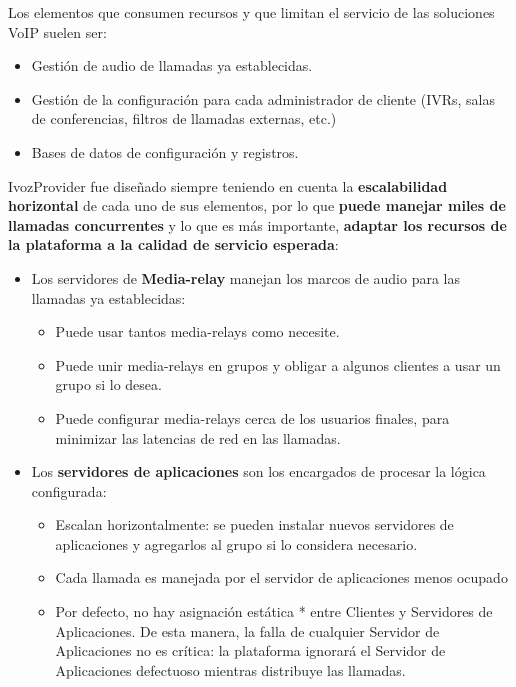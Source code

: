 \documentclass[letterpaper,10pt,spanish]{sphinxmanual}
\begin{document}
Los elementos que consumen recursos y que limitan el servicio de las soluciones VoIP suelen ser:
\begin{itemize}
\item {} 
Gestión de audio de llamadas ya establecidas.

\item {} 
Gestión de la configuración para cada administrador de cliente (IVRs, salas de conferencias, filtros de llamadas externas, etc.)

\item {} 
Bases de datos de configuración y registros.

\end{itemize}

IvozProvider fue diseñado siempre teniendo en cuenta la \textbf{escalabilidad horizontal} de cada uno de sus elementos, por lo que \textbf{puede manejar miles de llamadas concurrentes} y lo que es más importante, \textbf{adaptar los recursos de la plataforma a la calidad de servicio esperada}:
\begin{itemize}
\item {} 
Los servidores de \textbf{Media-relay} manejan los marcos de audio para las llamadas ya establecidas:
\begin{itemize}
\item {} 
Puede usar tantos media-relays como necesite.

\item {} 
Puede unir media-relays en grupos y obligar a algunos clientes a usar un grupo si lo desea.

\item {} 
Puede configurar media-relays cerca de los usuarios finales, para minimizar las latencias de red en las llamadas.

\end{itemize}

\item {} 
Los \textbf{servidores de aplicaciones} son los encargados de procesar la lógica configurada:
\begin{itemize}
\item {} 
Escalan horizontalmente: se pueden instalar nuevos servidores de aplicaciones y agregarlos al grupo si lo considera necesario.

\item {} 
Cada llamada es manejada por el servidor de aplicaciones menos ocupado

\item {} 
Por defecto, no hay asignación estática * entre Clientes y Servidores de Aplicaciones. De esta manera, la falla de cualquier Servidor de Aplicaciones no es crítica: la plataforma ignorará el Servidor de Aplicaciones defectuoso mientras distribuye las llamadas.

\end{itemize}

\end{itemize}
\end{document}
